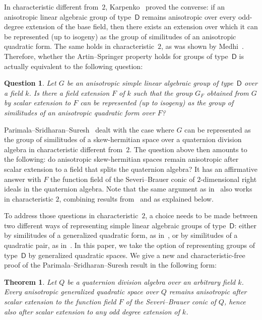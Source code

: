 \documentclass{amsart}
\newcommand{\FQ}{F}
\newtheorem*{thm}{Theorem}
\newtheorem*{question}{Question}
\theoremstyle{remark}
\begin{document}
In characteristic different from~$2$, Karpenko~\cite{Kar} proved the
converse: if an anisotropic linear algebraic group of
type~$\mathsf{D}$ remains anisotropic over every odd-degree extension
of the base field, then there exists an extension over which it can be
represented (up to isogeny) as the group of similitudes of an
anisotropic quadratic form. The same holds in characteristic~$2$, as
was shown by Medhi~\cite{Medhi}. Therefore, whether the
Artin--Springer property holds for groups of type~$\mathsf{D}$ is
actually equivalent to the following question:

\begin{question}
  Let $G$ be an anisotropic simple linear algebraic group of
  type~$\mathsf{D}$ over a field $k$. Is there a field extension $F$
  of $k$ such that the group $G_F$ obtained from $G$ by scalar
  extension to $F$ can be represented (up to isogeny) as the group of
  similitudes of an anisotropic quadratic form over $F$?
\end{question}

Parimala--Sridharan--Suresh~\cite{PSS} dealt with the case where $G$
can be represented as the group of similitudes of a skew-hermitian
space over a quaternion division algebra in characteristic different
from~$2$. The question above then amounts to the following: do
anisotropic skew-hermitian spaces remain anisotropic after scalar
extension to a field that splits the quaternion algebra? It has an
affirmative answer with $F$ 
the function field of the Severi--Brauer conic of $2$-dimensional
right ideals in the quaternion algebra. 
Note that the same argument as in~\cite{PSS} also works in
characteristic $2$, combining results from~\cite{BD} and \cite{MT} as
explained below. 

To address those questions in characteristic~$2$, a choice needs to be made between two different
ways of representing simple linear algebraic groups of
type~$\mathsf{D}$: either by similitudes of a generalized quadratic
form, as in~\cite[\S\,3]{Tits}, or by similitudes of a quadratic pair,
as in~\cite[\S\,26]{BoI}. In this paper, we take the option of representing groups of type~$\mathsf{D}$ by
generalized quadratic spaces. We give a new and characteristic-free
proof of the Parimala--Sridharan--Suresh result in the following form:

\begin{thm}
  Let $Q$ be a quaternion division algebra over an arbitrary field
  $k$. Every anisotropic generalized quadratic space over $Q$ remains
  anisotropic after scalar extension to the function field $\FQ$ of
  the Severi--Brauer conic of $Q$, hence also after scalar extension to any odd degree extension of $k$. 
\end{thm}
\end{document}
